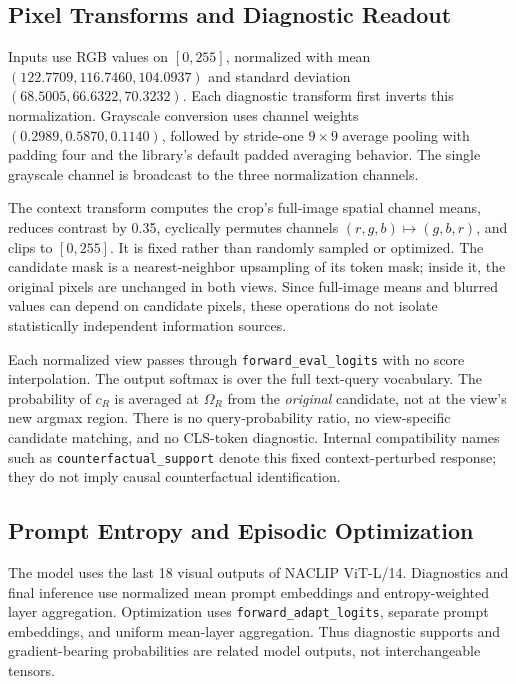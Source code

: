 \subsection{Pixel Transforms and Diagnostic Readout}
Inputs use RGB values on $[0,255]$, normalized with mean $(122.7709,116.7460,104.0937)$ and standard deviation $(68.5005,66.6322,70.3232)$. Each diagnostic transform first inverts this normalization. Grayscale conversion uses channel weights $(0.2989,0.5870,0.1140)$, followed by stride-one $9\times9$ average pooling with padding four and the library's default padded averaging behavior. The single grayscale channel is broadcast to the three normalization channels.

The context transform computes the crop's full-image spatial channel means, reduces contrast by 0.35, cyclically permutes channels $(r,g,b)\mapsto(g,b,r)$, and clips to $[0,255]$. It is fixed rather than randomly sampled or optimized. The candidate mask is a nearest-neighbor upsampling of its token mask; inside it, the original pixels are unchanged in both views. Since full-image means and blurred values can depend on candidate pixels, these operations do not isolate statistically independent information sources.

Each normalized view passes through \texttt{forward\_eval\_logits} with no score interpolation. The output softmax is over the full text-query vocabulary. The probability of $c_R$ is averaged at $\Omega_R$ from the \emph{original} candidate, not at the view's new argmax region. There is no query-probability ratio, no view-specific candidate matching, and no CLS-token diagnostic. Internal compatibility names such as \texttt{counterfactual\_support} denote this fixed context-perturbed response; they do not imply causal counterfactual identification.

\subsection{Prompt Entropy and Episodic Optimization}
The model uses the last 18 visual outputs of NACLIP ViT-L/14. Diagnostics and final inference use normalized mean prompt embeddings and entropy-weighted layer aggregation. Optimization uses \texttt{forward\_adapt\_logits}, separate prompt embeddings, and uniform mean-layer aggregation. Thus diagnostic supports and gradient-bearing probabilities are related model outputs, not interchangeable tensors.

